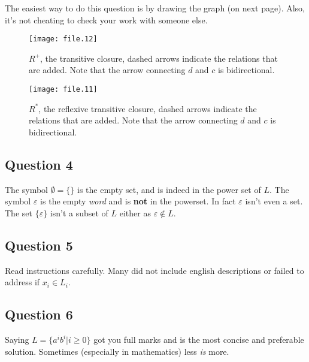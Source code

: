 \documentclass[12pt]{article}
\begin{document}
The easiest way to do this question is by drawing the graph (on next page). Also, it's not cheating to check your work with someone else.

\begin{figure}[htbp]
\begin{center}
\texttt{[image: file.12]}
\caption{$R^+$, the transitive closure, dashed arrows indicate the relations that are added. Note that the arrow connecting $d$ and $c$ is bidirectional.}
\end{center}
\end{figure}

\begin{figure}[htbp]
\begin{center}
\texttt{[image: file.11]}
\caption{$R^*$, the reflexive transitive closure, dashed arrows indicate the relations that are added. Note that the arrow connecting $d$ and $c$ is bidirectional.}
\end{center}
\end{figure}

\subsection*{Question 4}
The symbol $\emptyset = \{ \}$ is the empty set, and is indeed in the power set of $L$. The symbol $\varepsilon$ is the empty \emph{word} and is \textbf{not} in the powerset. In fact $\varepsilon$ isn't even a set. The set $\{ \varepsilon \}$ isn't a subset of $L$ either as $\varepsilon \not \in L$.

\subsection*{Question 5}
Read instructions carefully. Many did not include english descriptions or failed to address if $x_i \in L_i$.

\subsection*{Question 6}
Saying $L = \{a^i b^i | i\geq 0\}$ got you full marks and is the most concise and preferable solution. Sometimes (especially in mathematics) less \emph{is} more.

\PutEnd
\end{document}
